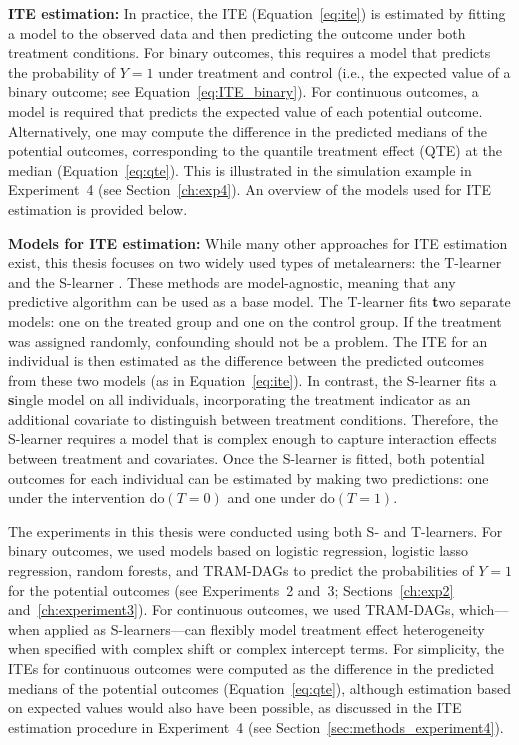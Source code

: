 
\textbf{ITE estimation:} In practice, the ITE (Equation~\ref{eq:ite}) is estimated by fitting a model to the observed data and then predicting the outcome under both treatment conditions. For binary outcomes, this requires a model that predicts the probability of $Y = 1$ under treatment and control (i.e., the expected value of a binary outcome; see Equation~\ref{eq:ITE_binary}). For continuous outcomes, a model is required that predicts the expected value of each potential outcome. Alternatively, one may compute the difference in the predicted medians of the potential outcomes, corresponding to the quantile treatment effect (QTE) \citep{chernozhukov2005} at the median (Equation~\ref{eq:qte}). This is illustrated in the simulation example in Experiment~4 (see Section~\ref{ch:exp4}). An overview of the models used for ITE estimation is provided below.


\medskip

\textbf{Models for ITE estimation:} \label{sec:ite_models} While many other approaches for ITE estimation exist, this thesis focuses on two widely used types of metalearners: the T-learner and the S-learner \citep{kunzel2019}. These methods are model-agnostic, meaning that any predictive algorithm can be used as a base model. The T-learner fits \textbf{t}wo separate models: one on the treated group and one on the control group. If the treatment was assigned randomly, confounding should not be a problem. The ITE for an individual is then estimated as the difference between the predicted outcomes from these two models (as in Equation~\ref{eq:ite}). In contrast, the S-learner fits a \textbf{s}ingle model on all individuals, incorporating the treatment indicator as an additional covariate to distinguish between treatment conditions. Therefore, the S-learner requires a model that is complex enough to capture interaction effects between treatment and covariates. Once the S-learner is fitted, both potential outcomes for each individual can be estimated by making two predictions: one under the intervention $\text{do}(T = 0)$ and one under $\text{do}(T = 1)$.

The experiments in this thesis were conducted using both S- and T-learners. For binary outcomes, we used models based on logistic regression, logistic lasso regression, random forests, and TRAM-DAGs to predict the probabilities of $Y = 1$ for the potential outcomes (see Experiments~2 and~3; Sections~\ref{ch:exp2} and~\ref{ch:experiment3}). For continuous outcomes, we used TRAM-DAGs, which—when applied as S-learners—can flexibly model treatment effect heterogeneity when specified with complex shift or complex intercept terms. For simplicity, the ITEs for continuous outcomes were computed as the difference in the predicted medians of the potential outcomes (Equation~\ref{eq:qte}), although estimation based on expected values would also have been possible, as discussed in the ITE estimation procedure in Experiment~4 (see Section~\ref{sec:methods_experiment4}).



